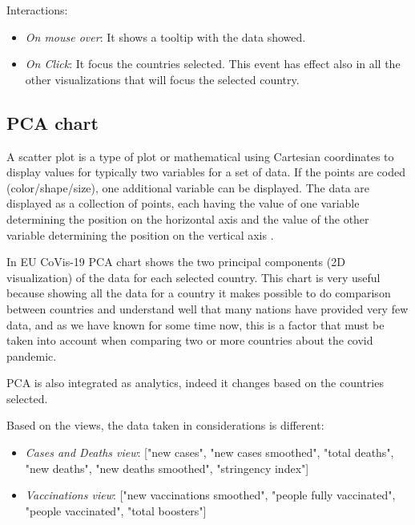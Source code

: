 \documentclass[10pt,conference]{IEEEtran}
\begin{document}
Interactions:
\begin{itemize}
	\item {\em On mouse over}: It shows a tooltip with the data showed.
	\item {\em On Click}: It focus the countries selected. This event has effect also in all the other visualizations that will focus the selected country.
\end{itemize}

\begin{figure}
\end{figure}

\subsection{PCA chart}
A scatter plot is a type of plot or mathematical
using Cartesian coordinates to display values for typically two variables for a set of data. If the points are coded (color/shape/size), 
one additional variable can be displayed. The data are displayed as a collection of points, each having the value of one variable 
determining the position on the horizontal axis and the value of the other variable determining the position on the vertical axis \cite{scatter}.

In EU CoVis-19 PCA chart shows the two principal components (2D visualization) of the data for each selected country. This chart is very useful because showing all the data for a country it makes possible to do comparison between 
countries and understand well that many nations have provided very few data, and as we have known for some time now, this is a factor that must be taken into account when comparing two or more countries about the covid pandemic.

PCA is also integrated as analytics, indeed it changes based on the countries selected.

Based on the views, the data taken in considerations is different:
\begin{itemize}
	\item {\em Cases and Deaths view}: ["new cases", "new cases smoothed", "total deaths", "new deaths", "new deaths smoothed", "stringency index"]
	\item {\em Vaccinations view}: ["new vaccinations smoothed", "people fully vaccinated", "people vaccinated", "total boosters"]
\end{itemize}
\end{document}
